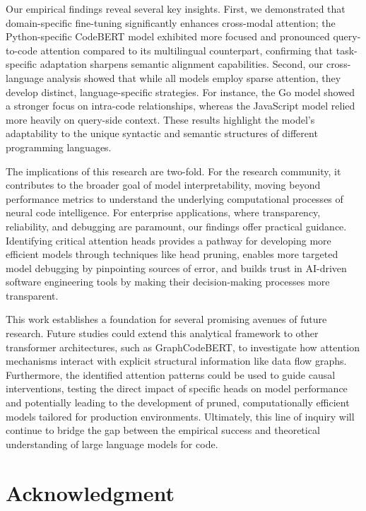\documentclass[conference]{IEEEtran}
\begin{document}
{Our empirical findings reveal several key insights. First, we demonstrated that domain-specific fine-tuning significantly enhances cross-modal attention; the Python-specific CodeBERT model exhibited more focused and pronounced query-to-code attention compared to its multilingual counterpart, confirming that task-specific adaptation sharpens semantic alignment capabilities. Second, our cross-language analysis showed that while all models employ sparse attention, they develop distinct, language-specific strategies. For instance, the Go model showed a stronger focus on intra-code relationships, whereas the JavaScript model relied more heavily on query-side context. These results highlight the model's adaptability to the unique syntactic and semantic structures of different programming languages.

The implications of this research are two-fold. For the research community, it contributes to the broader goal of model interpretability, moving beyond performance metrics to understand the underlying computational processes of neural code intelligence. For enterprise applications, where transparency, reliability, and debugging are paramount, our findings offer practical guidance. Identifying critical attention heads provides a pathway for developing more efficient models through techniques like head pruning, enables more targeted model debugging by pinpointing sources of error, and builds trust in AI-driven software engineering tools by making their decision-making processes more transparent.

This work establishes a foundation for several promising avenues of future research. Future studies could extend this analytical framework to other transformer architectures, such as GraphCodeBERT, to investigate how attention mechanisms interact with explicit structural information like data flow graphs. Furthermore, the identified attention patterns could be used to guide causal interventions, testing the direct impact of specific heads on model performance and potentially leading to the development of pruned, computationally efficient models tailored for production environments. Ultimately, this line of inquiry will continue to bridge the gap between the empirical success and theoretical understanding of large language models for code.



\section*{Acknowledgment}

}
\end{document}
